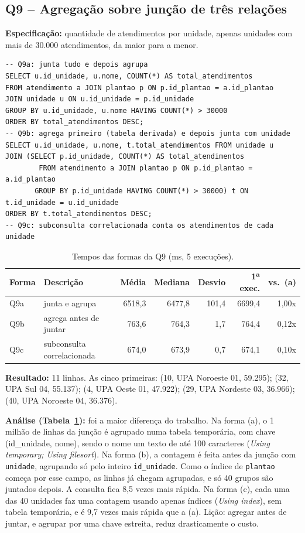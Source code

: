 \documentclass[10pt,a4paper]{article}
\begin{document}
\subsection{Q9 -- Agregação sobre junção de três relações}
\textbf{Especificação:} quantidade de atendimentos por unidade, apenas unidades com mais de 30.000 atendimentos, da maior para a menor.

\begin{lstlisting}
-- Q9a: junta tudo e depois agrupa
SELECT u.id_unidade, u.nome, COUNT(*) AS total_atendimentos
FROM atendimento a JOIN plantao p ON p.id_plantao = a.id_plantao
JOIN unidade u ON u.id_unidade = p.id_unidade
GROUP BY u.id_unidade, u.nome HAVING COUNT(*) > 30000
ORDER BY total_atendimentos DESC;
-- Q9b: agrega primeiro (tabela derivada) e depois junta com unidade
SELECT u.id_unidade, u.nome, t.total_atendimentos FROM unidade u
JOIN (SELECT p.id_unidade, COUNT(*) AS total_atendimentos
        FROM atendimento a JOIN plantao p ON p.id_plantao = a.id_plantao
       GROUP BY p.id_unidade HAVING COUNT(*) > 30000) t ON t.id_unidade = u.id_unidade
ORDER BY t.total_atendimentos DESC;
-- Q9c: subconsulta correlacionada conta os atendimentos de cada unidade
\end{lstlisting}

\begin{table}[H]\centering\footnotesize
\caption{Tempos das formas da Q9 (ms, 5 execuções).}\label{tab:q9}
\begin{tabular}{llrrrrr}\toprule
Forma & Descrição & Média & Mediana & Desvio & 1ª exec. & vs.\ (a) \\ \midrule
Q9a & junta e agrupa              & 6518,3 & 6477,8 & 101,4 & 6699,4 & 1,00x \\
Q9b & agrega antes de juntar      &  763,6 &  764,3 &   1,7 &  764,4 & 0,12x \\
Q9c & subconsulta correlacionada  &  674,0 &  673,9 &   0,7 &  674,1 & 0,10x \\ \bottomrule
\end{tabular}
\end{table}

\textbf{Resultado:} 11 linhas. As cinco primeiras: (10, UPA Noroeste 01, 59.295); (32, UPA Sul 04, 55.137); (4, UPA Oeste 01, 47.922); (29, UPA Nordeste 03, 36.966); (40, UPA Noroeste 04, 36.376).

\textbf{Análise (Tabela~\ref{tab:q9}):} foi a maior diferença do trabalho. Na forma (a), o 1 milhão de linhas da junção é agrupado numa tabela temporária, com chave (id\_unidade, nome), sendo o nome um texto de até 100 caracteres (\emph{Using temporary; Using filesort}). Na forma (b), a contagem é feita antes da junção com \texttt{unidade}, agrupando só pelo inteiro \texttt{id\_unidade}. Como o índice de \texttt{plantao} começa por esse campo, as linhas já chegam agrupadas, e só 40 grupos são juntados depois. A consulta fica 8,5 vezes mais rápida. Na forma (c), cada uma das 40 unidades faz uma contagem usando apenas índices (\emph{Using index}), sem tabela temporária, e é 9,7 vezes mais rápida que a (a). Lição: agregar antes de juntar, e agrupar por uma chave estreita, reduz drasticamente o custo.
\end{document}
